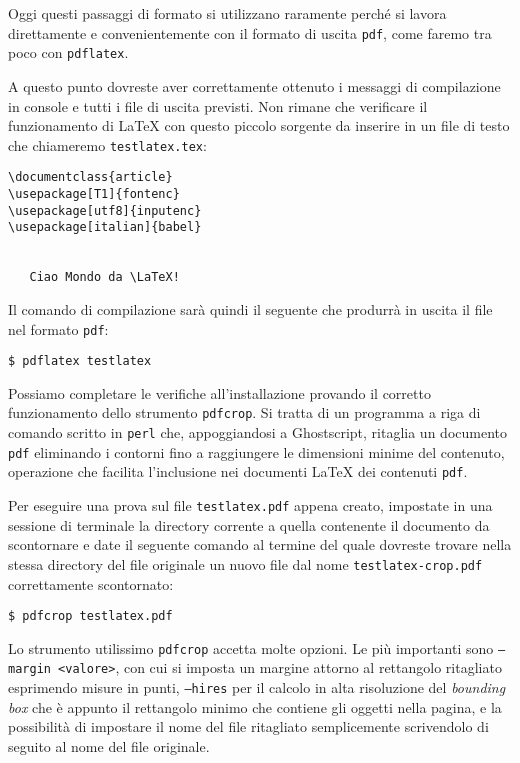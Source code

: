 Oggi questi passaggi di formato si utilizzano raramente perché si lavora direttamente e convenientemente con il formato di uscita \texttt{pdf}, come faremo tra poco con \texttt{pdflatex}.

A questo punto dovreste aver correttamente ottenuto i messaggi di compilazione in console e tutti i file di uscita previsti. Non rimane che verificare il funzionamento di \LaTeX{} con questo piccolo sorgente da inserire in un file di testo che chiameremo \texttt{testlatex.tex}:
\begin{Verbatim}[fontsize=\small]
\documentclass{article}
\usepackage[T1]{fontenc}
\usepackage[utf8]{inputenc}
\usepackage[italian]{babel}


   Ciao Mondo da \LaTeX!

\end{Verbatim}

Il comando di compilazione sarà quindi il seguente che produrrà in uscita il file nel formato \texttt{pdf}:
\begin{verbatim}
$ pdflatex testlatex
\end{verbatim}

Possiamo completare le verifiche all'installazione provando il corretto funzionamento dello strumento \texttt{pdfcrop}. Si tratta di un programma a riga di comando scritto in \texttt{perl} che, appoggiandosi a \textsf{Ghostscript}, ritaglia un documento \texttt{pdf} eliminando i contorni fino a raggiungere le dimensioni minime del contenuto, operazione che facilita l'inclusione nei documenti \LaTeX{} dei contenuti \texttt{pdf}.

Per eseguire una prova sul file \texttt{testlatex.pdf} appena creato, impostate in una sessione di terminale la directory corrente a quella contenente il documento da scontornare e date il seguente comando al termine del quale dovreste trovare nella stessa directory del file originale un nuovo file dal nome \texttt{testlatex-crop.pdf} correttamente scontornato:
\begin{verbatim}
$ pdfcrop testlatex.pdf
\end{verbatim}

Lo strumento utilissimo \texttt{pdfcrop} accetta molte opzioni. Le più importanti sono \texttt{--margin <valore>}, con cui si imposta un margine attorno al rettangolo ritagliato esprimendo misure in punti, \texttt{--hires} per il calcolo in alta risoluzione del \emph{bounding box} che è appunto il rettangolo minimo che contiene gli oggetti nella pagina, e la possibilità di impostare il nome del file ritagliato semplicemente scrivendolo di seguito al nome del file originale.

